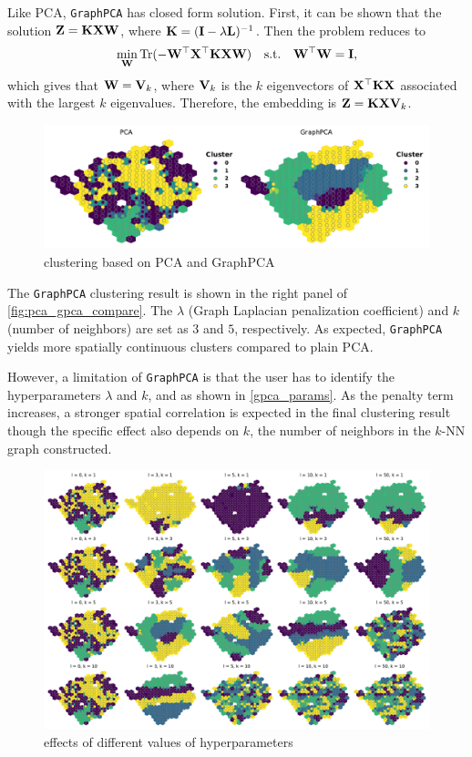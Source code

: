 \documentclass[11pt,oneside]{article}
\newcommand{\mat}[1]{
  \ifcat\noexpand#1\relax
    \bm{#1}
  \else
    \mathbf{#1}
  \fi
}
\newcommand{\tr}{\text{Tr}}
\begin{document}
Like PCA, \texttt{GraphPCA} has closed form solution. First, it can be shown that the solution $\mat Z = \mat K\mat X\mat W$, where $\mat K = (\mat I - \lambda \mat L)^{-1}$. Then the problem reduces to
\begin{equation*}
\min_{\mat W}\tr(-\mat W^\top\mat X^\top\mat K\mat X\mat W)\quad\text{s.t.}\quad \mat W^\top\mat W = \mat I,
\end{equation*}
which gives that $\mat W = \mat V_k$, where $\mat V_k$ is the $k$ eigenvectors of $\mat X^\top\mat K\mat X$ associated with the largest $k$ eigenvalues. Therefore, the embedding is $\mat Z = \mat K\mat X\mat V_k$.

\begin{figure}[ht]
\centering
\includegraphics[width=.9\textwidth]{3pca_gpca_compare.pdf}
\caption{clustering based on PCA and GraphPCA}
\label{fig:pca_gpca_compare}
\end{figure}

The \texttt{GraphPCA} clustering result is shown in the right panel of \autoref{fig:pca_gpca_compare}. The $\lambda$ (Graph Laplacian penalization coefficient) and $k$ (number of neighbors) are set as $3$ and $5$, respectively. As expected, \texttt{GraphPCA} yields more spatially continuous clusters compared to plain PCA.

However, a limitation of \texttt{GraphPCA} is that the user has to identify the hyperparameters $\lambda$ and $k$, and as shown in \autoref{gpca_params}. As the penalty term increases, a stronger spatial correlation is expected in the final clustering result though the specific effect also depends on $k$, the number of neighbors in the $k$-NN graph constructed.

\begin{figure}[ht]
\centering
\includegraphics[width=.9\textwidth]{3gpca_params.pdf}
\caption{effects of different values of hyperparameters}
\label{gpca_params}
\end{figure}
\end{document}
